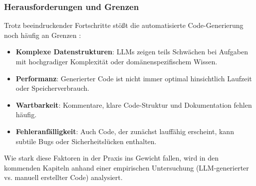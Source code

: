 \documentclass[11pt,a4paper]{article}
\begin{document}
\subsubsection{Herausforderungen und Grenzen}
Trotz beeindruckender Fortschritte stößt die automatisierte Code-Generierung noch häufig an Grenzen \cite{web:5,web:6}:
\begin{itemize}
    \item \textbf{Komplexe Datenstrukturen}: LLMs zeigen teils Schwächen bei Aufgaben mit hochgradiger Komplexität oder domänenspezifischem Wissen.
    \item \textbf{Performanz}: Generierter Code ist nicht immer optimal hinsichtlich Laufzeit oder Speicherverbrauch.
    \item \textbf{Wartbarkeit}: Kommentare, klare Code-Struktur und Dokumentation fehlen häufig.
    \item \textbf{Fehleranfälligkeit}: Auch Code, der zunächst lauffähig erscheint, kann subtile Bugs oder Sicherheitslücken enthalten.
\end{itemize}

Wie stark diese Faktoren in der Praxis ins Gewicht fallen, wird in den kommenden Kapiteln anhand einer empirischen Untersuchung (LLM-generierter vs. manuell erstellter Code) analysiert.

\printbibliography
\end{document}
